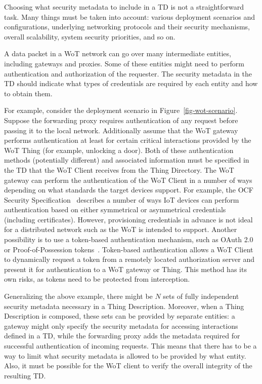 Choosing what security metadata to include in a TD is not a straightforward task.
Many things must be taken into account: 
various deployment scenarios and configurations, 
underlying networking protocols and their security mechanisms, 
overall scalability, system security priorities, and so on.

A data packet in a WoT network can go over many intermediate entities,
including gateways and proxies.
Some of these entities might need to perform authentication 
and authorization of the requester. 
The security metadata in the TD should indicate
what types of credentials are required by each entity and how to obtain them.

For example, consider the deployment scenario in Figure~\ref{fig-wot-scenario}.
Suppose the forwarding proxy requires authentication of any request before passing it to the local network.
Additionally assume that the WoT gateway performs authentication 
at least for certain critical interactions provided by the WoT Thing 
(for example, unlocking a door). 
Both of these authentication methods (potentially different) and 
associated information must be specified in the TD 
that the WoT Client receives from the Thing Directory.
The WoT gateway can perform the authentication of the WoT Client 
in a number of ways depending on what standards the target devices support.
For example, the OCF Security Specification~\cite{ocf2017} 
describes a number of ways IoT devices can perform authentication based on 
either symmetrical or asymmetrical credentials (including certificates). 
However, provisioning credentials in advance 
is not ideal for a distributed network such as the WoT is intended to support.
Another possibility is to use a token-based authentication mechanism,
such as OAuth 2.0 or Proof-of-Possession tokens~\cite{ace2017}.
Token-based authentication allows  
a WoT Client to dynamically request a token from a remotely 
located authorization server and present it for 
authentication to a WoT gateway or Thing.
This method has its own risks, as tokens need to be protected
from interception.

Generalizing the above example, 
there might be $N$ sets of fully independent security metadata
necessary in a Thing Description.
Moreover, when a Thing Description is composed, 
these sets can be provided by separate entities: 
a gateway might only specify the security metadata for accessing interactions defined in a TD,
while the forwarding proxy adds the metadata required for successful authentication of incoming requests.
This means that there has to be a way to limit what security metadata 
is allowed to be provided by what entity.
Also, it must be possible for the WoT client to verify the overall integrity of the resulting TD. 
 
